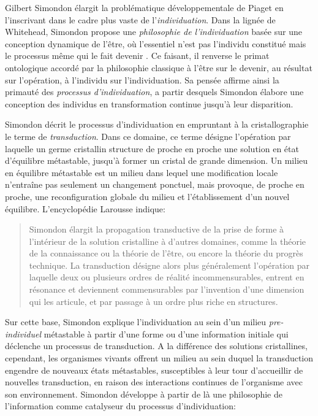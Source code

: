 \noindent
Gilbert Simondon élargit la problématique développementale de Piaget en l'inscrivant dans le cadre plus vaste de l'\emph{individuation}.
Dans la lignée de Whitehead, Simondon propose une \emph{philosophie de l'individuation} basée sur une conception dynamique de l'être, où l'essentiel n'est pas l'individu constitué mais le processus même qui le fait devenir  \cite{simondon_individu_1995}. 
Ce faisant, il renverse le primat ontologique accordé par la philosophie classique à l'être sur le devenir, au résultat sur l'opération, à l'individu sur l'individuation. 
Sa pensée affirme ainsi la primauté des \emph{processus d'individuation}, a partir desquels Simondon élabore une conception des individus en transformation continue jusqu'à leur disparition. 

Simondon décrit le processus d'individuation en empruntant à la cristallographie le terme de \emph{transduction}. 
Dans ce domaine, ce terme désigne l'opération par laquelle un germe cristallin structure de proche en proche une solution en état d'équilibre métastable, jusqu'à former un cristal de grande dimension. 
Un milieu en équilibre métastable est un milieu dans lequel une modification locale n'entraîne pas seulement un changement ponctuel, mais provoque, de proche en proche, une reconfiguration globale du milieu et l'établissement d’un nouvel équilibre.
L'encyclopédie Larousse indique: 

\begin{quote}
	Simondon élargit la propagation transductive de la prise de forme à l'intérieur de la solution cristalline à d'autres domaines, comme la théorie de la connaissance ou la théorie de l'être, ou encore la théorie du progrès technique. La transduction désigne alors plus généralement l'opération par laquelle deux ou plusieurs ordres de réalité incommensurables, entrent en résonance et deviennent commensurables par l'invention d'une dimension qui les articule, et par passage à un ordre plus riche en structures.
\end{quote}

Sur cette base, Simondon explique l'individuation au sein d'un milieu \emph{pre-individuel} métastable à partir d'une forme ou d'une information initiale qui déclenche un processus de transduction. 
A la différence des solutions cristallines, cependant, les organismes vivants offrent un milieu au sein duquel la transduction engendre de nouveaux états métastables, susceptibles à leur tour d'accueillir de nouvelles transduction, en raison des interactions continues de l'organisme avec son environnement.
Simondon développe à partir de là une philosophie de l'information comme catalyseur du processus d'individuation: 

